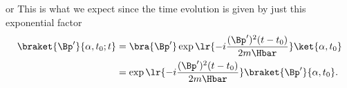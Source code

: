 {or
%
%
This is what we expect since the time evolution is given by just this exponential factor
%
\begin{equation}\label{eqn:freeParticlePropagator:220}
\begin{aligned}
\braket{\Bp'}{\alpha, t_0 ; t}
&= \bra{\Bp'} \exp\lr{ -i \frac{(\Bp')^2 (t -t_0)}{2 m \Hbar}} \ket{\alpha, t_0} \\
&=
\exp\lr{ -i \frac{(\Bp')^2 (t -t_0)}{2 m \Hbar}}
\braket{\Bp'}
{\alpha, t_0}.
\end{aligned}
\end{equation}
%
} %

